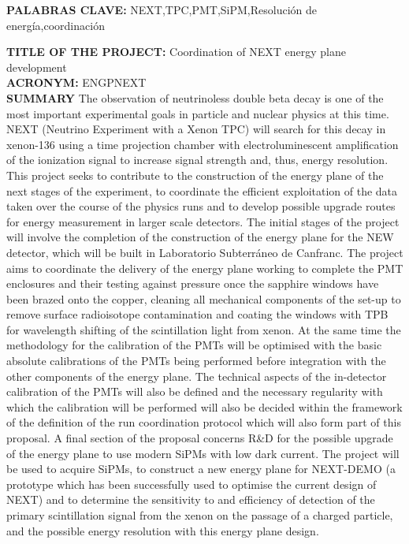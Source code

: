 \documentclass[a4paper,11pt,oneside]{article}
\begin{document}
\noindent\textbf{PALABRAS CLAVE:} NEXT,TPC,PMT,SiPM,Resoluci\'on de
energ\'ia,coordinaci\'on\\
\vspace{12pt}

\noindent\textbf{TITLE OF THE PROJECT:} Coordination of NEXT energy plane development\\
\textbf{ACRONYM:} ENGPNEXT\\
\textbf{SUMMARY} {\color{blue}{Maximum 3500 characters (including
    spaces):}}
The observation of neutrinoless double beta decay is one of the most
important experimental goals in particle and nuclear physics at this
time. NEXT (Neutrino Experiment with a Xenon TPC) will search for this
decay in xenon-136 using a time projection chamber with
electroluminescent amplification of the ionization signal to increase
signal strength and, thus, energy resolution. This project seeks to
contribute to the construction of the energy plane of the next stages
of the experiment, to coordinate the efficient exploitation of the data taken over the course of the physics runs and to develop possible upgrade routes for energy measurement in larger scale detectors.
The initial stages of the project will involve the completion of the
construction of the energy plane for the NEW detector, which will be
built in Laboratorio Subterr\'aneo de Canfranc. The project aims to
coordinate the delivery of the energy plane working to complete the
PMT enclosures and their testing against pressure once the
sapphire windows have been brazed onto the copper, cleaning all
mechanical components of the set-up to remove surface radioisotope
contamination and coating the windows with TPB for wavelength shifting
of the scintillation light from xenon. At the same time the
methodology for the calibration of the PMTs will be optimised with the
basic absolute calibrations of the PMTs being performed before
integration with the other components of the energy plane. The
technical aspects of the in-detector calibration of the PMTs will also
be defined and the necessary regularity with which the calibration
will be performed will also be decided within the framework of the
definition of the run coordination protocol which will also form part
of this proposal. A final section of the proposal concerns R\&D for
the possible upgrade of the energy plane to use modern SiPMs with low
dark current. The project will be used to acquire SiPMs, to construct
a new energy plane for NEXT-DEMO (a prototype which has been
successfully used to optimise the current design of NEXT) and to
determine the sensitivity to and efficiency of detection of the
primary scintillation signal from the xenon on the passage of a
charged particle, and the possible energy resolution with this energy
plane design.
\vspace{12pt}
\end{document}
